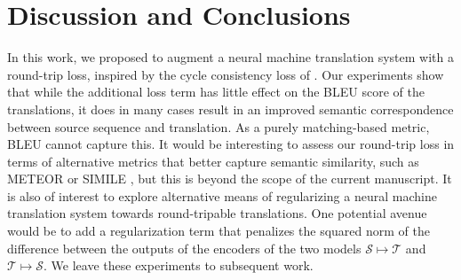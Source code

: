 \documentclass[10pt,a4paper]{article}
\begin{document}
\section{Discussion and Conclusions}\label{sec:discussion}
In this work, we proposed to augment a neural machine translation system with a round-trip loss, inspired by the cycle consistency loss of \citet{CycleGAN2017}. Our experiments show that while the additional loss term has little effect on the BLEU score of the translations, it does in many cases result in an improved semantic correspondence between source sequence and translation. As a purely matching-based metric, BLEU cannot capture this. It would be interesting to assess our round-trip loss in terms of alternative metrics that better capture semantic similarity, such as METEOR \citep{denkowski} or SIMILE \citep{wieting}, but this is beyond the scope of the current manuscript.
It is also of interest to explore alternative means of regularizing a neural machine translation system towards round-tripable translations. One potential avenue would be to add a regularization term that penalizes the squared norm of the difference between the outputs of the encoders of the two models $\mathcal{S}\mapsto\mathcal{T}$ and $\mathcal{T}\mapsto\mathcal{S}$. We leave these experiments to subsequent work.

\newpage

\end{document}
